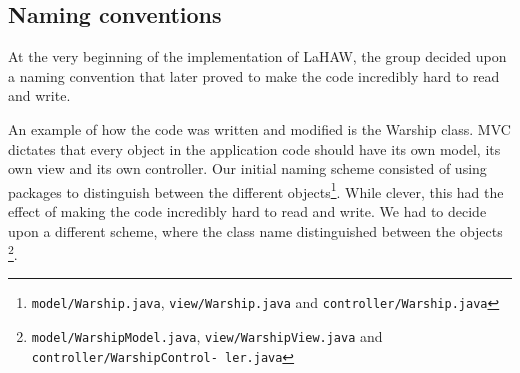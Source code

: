 \subsection{Naming conventions}
\label{sec:naming_conventions}
At the very beginning of the implementation of LaHAW, the group decided upon a naming convention that later proved to make the code incredibly hard to read and write.

An example of how the code was written and modified is the Warship class. MVC dictates that every object in the application code should have its own model, its own view and its own controller. Our initial naming scheme consisted of using packages to distinguish between the different objects{\footnote{\texttt{model/Warship.java}, \texttt{view/Warship.java} and \texttt{controller/Warship.java}}}. While clever, this had the effect of making the code incredibly hard to read and write. %
We had to decide upon a different scheme, where the class name distinguished between the objects \footnote{\texttt{model/WarshipModel.java}, \texttt{view/WarshipView.java} and \texttt{controller/WarshipControl- ler.java}}.

